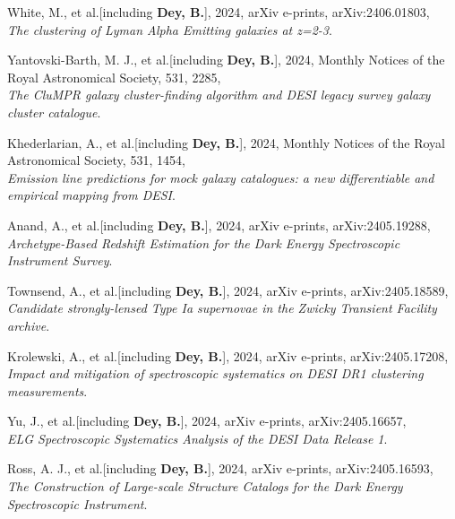 \item White, M., et al.[including \textbf{Dey, B.}], 2024, arXiv e-prints, arXiv:2406.01803, \\ \textit{The clustering of Lyman Alpha Emitting galaxies at z=2-3}. 
 

\item Yantovski-Barth, M. J., et al.[including \textbf{Dey, B.}], 2024, Monthly Notices of the Royal Astronomical Society, 531, 2285, \\ \textit{The CluMPR galaxy cluster-finding algorithm and DESI legacy survey galaxy cluster catalogue}. 
 

\item Khederlarian, A., et al.[including \textbf{Dey, B.}], 2024, Monthly Notices of the Royal Astronomical Society, 531, 1454, \\ \textit{Emission line predictions for mock galaxy catalogues: a new differentiable and empirical mapping from DESI}. 
 

\item Anand, A., et al.[including \textbf{Dey, B.}], 2024, arXiv e-prints, arXiv:2405.19288, \\ \textit{Archetype-Based Redshift Estimation for the Dark Energy Spectroscopic Instrument Survey}. 
 

\item Townsend, A., et al.[including \textbf{Dey, B.}], 2024, arXiv e-prints, arXiv:2405.18589, \\ \textit{Candidate strongly-lensed Type Ia supernovae in the Zwicky Transient Facility archive}. 
 

\item Krolewski, A., et al.[including \textbf{Dey, B.}], 2024, arXiv e-prints, arXiv:2405.17208, \\ \textit{Impact and mitigation of spectroscopic systematics on DESI DR1 clustering measurements}. 
 

\item Yu, J., et al.[including \textbf{Dey, B.}], 2024, arXiv e-prints, arXiv:2405.16657, \\ \textit{ELG Spectroscopic Systematics Analysis of the DESI Data Release 1}. 
 

\item Ross, A. J., et al.[including \textbf{Dey, B.}], 2024, arXiv e-prints, arXiv:2405.16593, \\ \textit{The Construction of Large-scale Structure Catalogs for the Dark Energy Spectroscopic Instrument}. 
 

